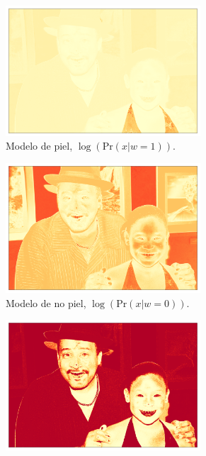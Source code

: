 \newpage
\begin{figure}[ht!]
    \centering
    \begin{subfigure}{0.4\textwidth}
        \centering
        \includegraphics[width=0.8\textwidth]{../figures/image3/image_03_distskin.png}
        \caption{Modelo de piel, $\log(\text{Pr}(x | w=1))$.}
    \end{subfigure}
    \hspace{1cm}
    \begin{subfigure}{0.4\textwidth}
        \centering
        \includegraphics[width=0.8\textwidth]{../figures/image3/image_03_distbg.png}
        \caption{Modelo de no piel, $\log(\text{Pr}(x | w=0))$.}
    \end{subfigure}
    \begin{subfigure}{0.4\textwidth}
        \centering
        \includegraphics[width=0.8\textwidth]{../figures/image3/image_03_postskin.png}

\end{subfigure}
\end{figure}
